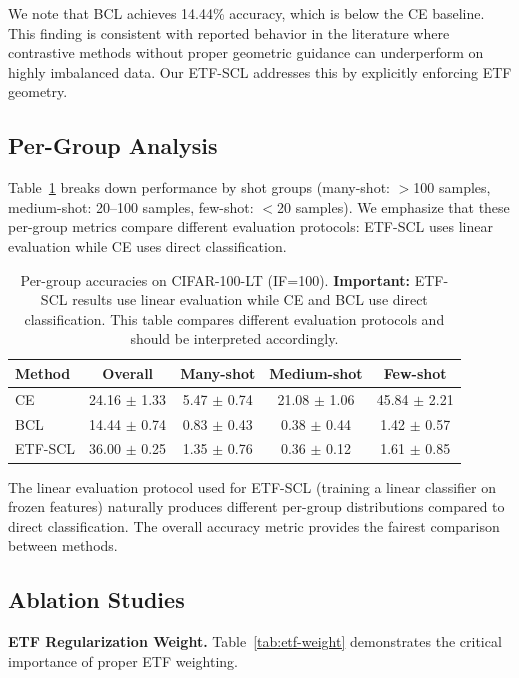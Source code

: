 \documentclass{article}
\begin{document}
We note that BCL achieves 14.44\% accuracy, which is below the CE baseline. This finding is consistent with reported behavior in the literature where contrastive methods without proper geometric guidance can underperform on highly imbalanced data. Our ETF-SCL addresses this by explicitly enforcing ETF geometry.

\subsection{Per-Group Analysis}

Table~\ref{tab:per-group} breaks down performance by shot groups (many-shot: $>$100 samples, medium-shot: 20--100 samples, few-shot: $<$20 samples). We emphasize that these per-group metrics compare different evaluation protocols: ETF-SCL uses linear evaluation while CE uses direct classification.

\begin{table}[t]
\caption{Per-group accuracies on CIFAR-100-LT (IF=100). \textbf{Important:} ETF-SCL results use linear evaluation while CE and BCL use direct classification. This table compares different evaluation protocols and should be interpreted accordingly.}
\label{tab:per-group}
\centering
\begin{tabular}{lcccc}
\toprule
Method & Overall & Many-shot & Medium-shot & Few-shot \\
\midrule
CE & 24.16 $\pm$ 1.33 & 5.47 $\pm$ 0.74 & 21.08 $\pm$ 1.06 & 45.84 $\pm$ 2.21 \\
BCL & 14.44 $\pm$ 0.74 & 0.83 $\pm$ 0.43 & 0.38 $\pm$ 0.44 & 1.42 $\pm$ 0.57 \\
ETF-SCL & 36.00 $\pm$ 0.25 & 1.35 $\pm$ 0.76 & 0.36 $\pm$ 0.12 & 1.61 $\pm$ 0.85 \\
\bottomrule
\end{tabular}
\end{table}

The linear evaluation protocol used for ETF-SCL (training a linear classifier on frozen features) naturally produces different per-group distributions compared to direct classification. The overall accuracy metric provides the fairest comparison between methods.

\subsection{Ablation Studies}

\textbf{ETF Regularization Weight.} Table~\ref{tab:etf-weight} demonstrates the critical importance of proper ETF weighting.
\end{document}
